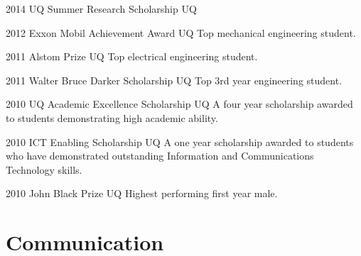 \documentclass[]{friggeri-cv} %
\begin{document}
\begin{entrylist}
\entryInlineSmall
    {2014}
    {UQ Summer Research Scholarship}
    {UQ}
    {}
\end{entrylist}
\begin{entrylist}
\entryInlineSmall
    {2012}
    {Exxon Mobil Achievement Award}
    {UQ}
    {Top mechanical engineering student.}
\end{entrylist}
\begin{entrylist}
\entryInlineSmall
    {2011}
    {Alstom Prize}
    {UQ}
    {Top electrical engineering student.}
\end{entrylist}
\begin{entrylist}
\entryInlineSmall
    {2011}
    {Walter Bruce Darker Scholarship}
    {UQ}
    {Top 3rd year engineering student.}
\end{entrylist}
\begin{entrylist}
\entryInlineSmall
    {2010}
    {UQ Academic Excellence Scholarship}
    {UQ}
    {A four year scholarship awarded to students demonstrating high academic ability.}
\end{entrylist}
\begin{entrylist}
\entryInlineSmall
    {2010}
    {ICT Enabling Scholarship}
    {UQ}
    {A one year scholarship awarded to students who have demonstrated outstanding Information and Communications Technology skills.}
\end{entrylist}
\begin{entrylist}
\entryInlineSmall
    {2010}
    {John Black Prize}
    {UQ}
    {Highest performing first year male.}
\end{entrylist}
















\section{Communication}
\end{document}
